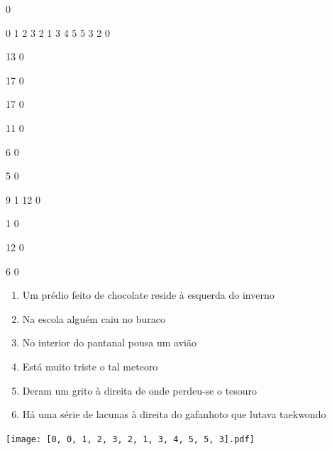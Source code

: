 \documentclass[12pt]{article}
\begin{document}
		\vfill  
		  
{
	0	%

	0	%
	1	%
	2	%
	3	%
	2	%
	1	%
	3	%
	4	%
	5	%
	5	%
	3	%
	2	%
	0	%

	13	%
	0	%

	17	%
	0	%

	17	%
	0	%

	11	%
	0	%

	6	%
	0	%

	5	%
	0	%

	9	%
	1	%
	12	%
	0	%

	1	%
	0	%

	12	%
	0	%

	6	%
	0	%

}	  
		    	

		 

\pagebreak


	\begin{enumerate}
		  \sffamily %
		  \large %


\vfill \item
Um prédio feito de chocolate reside	%
à esquerda
do inverno	%

\vfill \item
Na escola	%
alguém caiu no buraco	%

\vfill \item
No interior do pantanal	%
pousa um avião	%

\vfill \item
Está muito triste	%
o tal meteoro	%

\vfill \item
Deram um grito	%
à direita
de onde perdeu-se o tesouro	%

\vfill \item
Há uma série de lacunas	%
à direita
do gafanhoto que lutava taekwondo	%
	\end{enumerate}
		  
		  \hfill

		  \vfill

\texttt{[image: [0, 0, 1, 2, 3, 2, 1, 3, 4, 5, 5, 3].pdf]}


	\hfill	  	  
\end{document}
